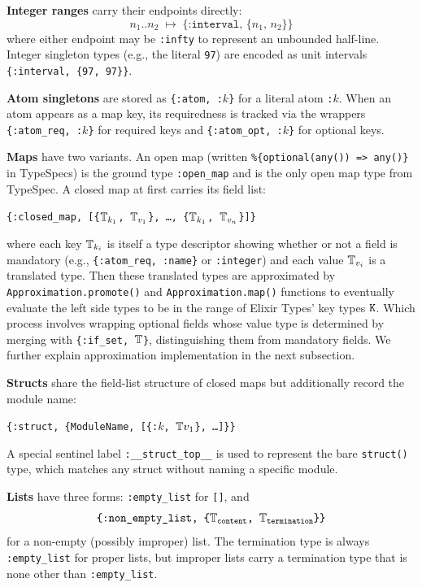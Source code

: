\medskip
\noindent\textbf{Integer ranges} carry their endpoints directly:
\[
  n_1\mathtt{..}n_2 \;\mapsto\; \texttt{\{:interval, \{$n_1$, $n_2$\}\}}
\]
where either endpoint may be \texttt{:infty} to represent an unbounded half-line.
Integer singleton types (e.g., the literal \texttt{97}) are encoded as unit intervals \texttt{\{:interval, \{97, 97\}\}}.

\medskip
\noindent\textbf{Atom singletons} are stored as \texttt{\{:atom, :$k$\}} for a literal atom \texttt{:$k$}.
When an atom appears as a map key, its requiredness is tracked via the wrappers \texttt{\{:atom\_req, :$k$\}} for required keys and \texttt{\{:atom\_opt, :$k$\}} for optional keys.

\medskip
\noindent\textbf{Maps} have two variants.
An open map (written \texttt{\%\{optional(any()) => any()\}} in TypeSpecs) is the ground type \texttt{:open\_map} and is the only open map type from TypeSpec.
A closed map at first carries its field list:
\begin{center}
\texttt{\{:closed\_map, [\{$\mathbb{T}_{k_1}$, $\mathbb{T}_{v_1}$\}, \ldots, \{$\mathbb{T}_{k_1}$, $\mathbb{T}_{v_n}$\}]\}}
\end{center}
where each key $\mathbb{T}_{k_i}$ is itself a type descriptor showing whether or not a field is mandatory (e.g., \texttt{\{:atom\_req, :name\}} or \texttt{:integer}) and each value $\mathbb{T}_{v_i}$ is a translated type.
Then these translated types are approximated by \texttt{Approximation.promote()} and \texttt{Approximation.map()} functions to eventually evaluate the left side types to be in the range of Elixir Types' key types $\texttt{K}$.
Which process involves wrapping optional fields whose value type is determined by merging with \texttt{\{:if\_set, $\mathbb{T}$\}}, distinguishing them from mandatory fields.
We further explain approximation implementation in the next subsection.

\medskip
\noindent\textbf{Structs} share the field-list structure of closed maps but additionally record the module name:
\begin{center}
\texttt{\{:struct, \{ModuleName, [\{:$k$, $\mathbb{T}{v_1}$\}, \ldots]\}\}}
\end{center}
A special sentinel label \texttt{:\_\_struct\_top\_\_} is used to represent the bare \texttt{struct()} type, which matches any struct without naming a specific module.

\medskip
\noindent\textbf{Lists} have three forms: \texttt{:empty\_list} for \texttt{[]}, and
\[
  \texttt{\{:non\_empty\_list, \{$\mathbb{T}_\text{content}$, $\mathbb{T}_\text{termination}$\}\}}
\]
for a non-empty (possibly improper) list.
The termination type is always \texttt{:empty\_list} for proper lists, but improper lists carry a termination type that is none other than \texttt{:empty\_list}.

